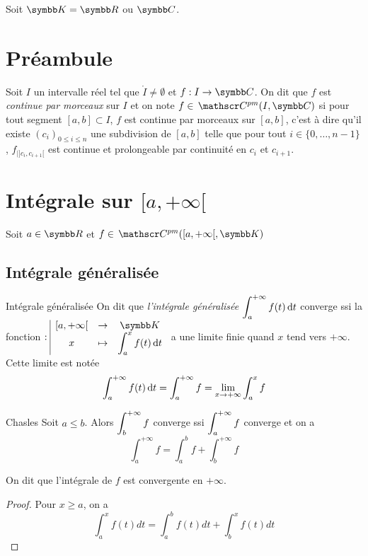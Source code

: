 Soit $\K = \R$ ou $\C$. 

\section*{Préambule}

\begin{definition}{}{}
    Soit $I$ un intervalle réel tel que $\mathring I \neq \emptyset$ et $f : I \to \C$. 
    On dit que $f$ est \textit{continue par morceaux} sur $I$ et on note $f \in \mc{pm}(I, \C)$ si pour tout segment 
    $[a, b] \subset I$, $f$ est continue par morceaux sur $[a, b]$, c'est à dire qu'il existe 
    $(c_i)_{0 \leq i \leq n}$ une subdivision de $[a, b]$ telle que pour tout $i \in \{0, \ldots, n-1\}$,
    $f_{|]c_i, c_{i+1}[}$ est continue et prolongeable par continuité en $c_i$ et $c_{i+1}$.
\end{definition}


\section{Intégrale sur \texorpdfstring{$[a, + \infty[$}{x >= a}}

Soit $a \in \R$ et $f \in \mc{pm} ([a, + \infty[, \K)$

\subsection{Intégrale généralisée }

\begin{definition}{Intégrale généralisée}{}
    On dit que \textit{l'intégrale généralisée} $\displaystyle \int_a^{+ \infty} f(t) \,\mathrm{d}t$ converge ssi 
    la fonction $\fonction{}{[a, + \infty[}{\K}{x}{\int_a^x f(t) \dt}$ a une limite finie quand 
    $x$ tend vers $+ \infty$. Cette limite est notée 
    $$\int_a^{+ \infty} f(t) \,\mathrm{d}t = \int_{a }^{+ \infty   } f = \lim_{x \to + \infty} \int_{a }^{x } f$$
\end{definition}

\begin{proposition}{Chasles}{}
    Soit $a \leqslant b $. Alors $\displaystyle \int_b^{+ \infty} f $ converge ssi 
    $\displaystyle \int_a^{+ \infty} f $ converge et on a 
    $$\int_a^{+ \infty} f = \int_a^b f + \int_b^{+ \infty} f$$

    On dit que l'intégrale de $f$ est convergente en $+\infty$.
\end{proposition}

\begin{proof}
    Pour $x \geqslant a$, on a 
    $$\int_a^x f(t) dt = \int_a^b f(t) dt + \int_b^x f(t) dt$$
\end{proof}

